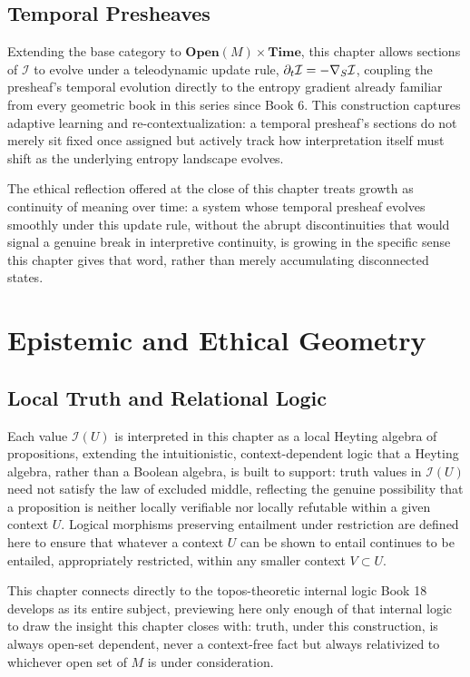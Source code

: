 \chapter{Temporal Presheaves}

Extending the base category to $\mathbf{Open}(M) \times \mathbf{Time}$, this chapter allows sections of $\mathcal{I}$ to evolve under a teleodynamic update rule, $\partial_t \mathcal{I} = -\nabla_{S} \mathcal{I}$, coupling the presheaf's temporal evolution directly to the entropy gradient already familiar from every geometric book in this series since Book 6. This construction captures adaptive learning and re-contextualization: a temporal presheaf's sections do not merely sit fixed once assigned but actively track how interpretation itself must shift as the underlying entropy landscape evolves.

The ethical reflection offered at the close of this chapter treats growth as continuity of meaning over time: a system whose temporal presheaf evolves smoothly under this update rule, without the abrupt discontinuities that would signal a genuine break in interpretive continuity, is growing in the specific sense this chapter gives that word, rather than merely accumulating disconnected states.

\part{Epistemic and Ethical Geometry}

\chapter{Local Truth and Relational Logic}

Each value $\mathcal{I}(U)$ is interpreted in this chapter as a local Heyting algebra of propositions, extending the intuitionistic, context-dependent logic that a Heyting algebra, rather than a Boolean algebra, is built to support: truth values in $\mathcal{I}(U)$ need not satisfy the law of excluded middle, reflecting the genuine possibility that a proposition is neither locally verifiable nor locally refutable within a given context $U$. Logical morphisms preserving entailment under restriction are defined here to ensure that whatever a context $U$ can be shown to entail continues to be entailed, appropriately restricted, within any smaller context $V \subset U$.

This chapter connects directly to the topos-theoretic internal logic Book 18 develops as its entire subject, previewing here only enough of that internal logic to draw the insight this chapter closes with: truth, under this construction, is always open-set dependent, never a context-free fact but always relativized to whichever open set of $M$ is under consideration.

